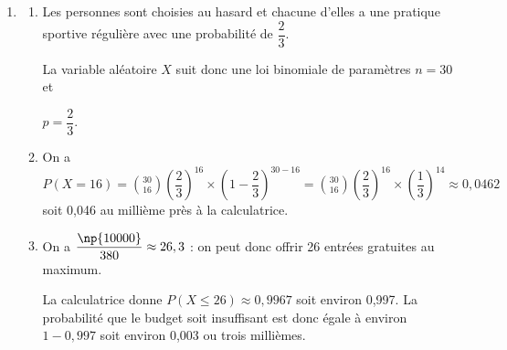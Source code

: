 \medskip



\begin{enumerate}[resume]
\item 
	

	

	\begin{enumerate}
		\item 
Les personnes sont choisies au hasard et chacune d'elles a une pratique sportive régulière avec une probabilité de $\dfrac23$.

La variable aléatoire $X$ suit donc une loi binomiale de paramètres $n = 30$ et 

$p = \dfrac23$.
		\item 
		On a $P(X = 16) = \displaystyle\binom{30}{16} \left(\dfrac23\right)^{16}\times \left(1 - \dfrac23\right)^{30 - 16} = \displaystyle\binom{30}{16} \left(\dfrac23\right)^{16}\times \left(\dfrac13\right)^{14} \approx 0,0462$ soit 0,046 au millième près à la calculatrice.
		\item 
		

		

On a $\dfrac{\np{10000}}{380}\approx 26,3$ : on peut donc offrir 26 entrées gratuites au maximum.

La calculatrice donne $P(X \leqslant 26) \approx 0,9967$ soit environ 0,997.
La probabilité que le budget soit insuffisant est donc égale à environ $1 - 0,997$ soit environ 0,003 ou trois millièmes.
	\end{enumerate}
\end{enumerate}

\bigskip

